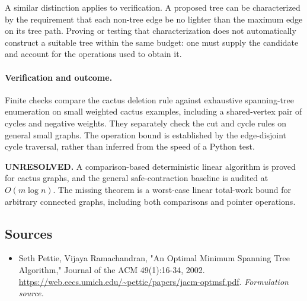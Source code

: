 \documentclass[11pt]{article}
\begin{document}
A similar distinction applies to verification. A proposed tree can be characterized by the requirement that each non-tree edge be no lighter than the maximum edge on its tree path. Proving or testing that characterization does not automatically construct a suitable tree within the same budget: one must supply the candidate and account for the operations used to obtain it.

\paragraph{Verification and outcome.}
Finite checks compare the cactus deletion rule against exhaustive spanning-tree enumeration on small weighted cactus examples, including a shared-vertex pair of cycles and negative weights. They separately check the cut and cycle rules on general small graphs. The operation bound is established by the edge-disjoint cycle traversal, rather than inferred from the speed of a Python test.

\textbf{UNRESOLVED.} A comparison-based deterministic linear algorithm is proved for cactus graphs, and the general safe-contraction baseline is audited at $O(m\log n)$. The missing theorem is a worst-case linear total-work bound for arbitrary connected graphs, including both comparisons and pointer operations.

\subsection{Sources}
\begin{itemize}
\item[S1]Seth Pettie, Vijaya Ramachandran, "An Optimal Minimum Spanning Tree Algorithm," Journal of the ACM 49(1):16-34, 2002.
\url{https://web.eecs.umich.edu/~pettie/papers/jacm-optmsf.pdf}.
\textit{Formulation source.}
\end{itemize}
\end{document}
